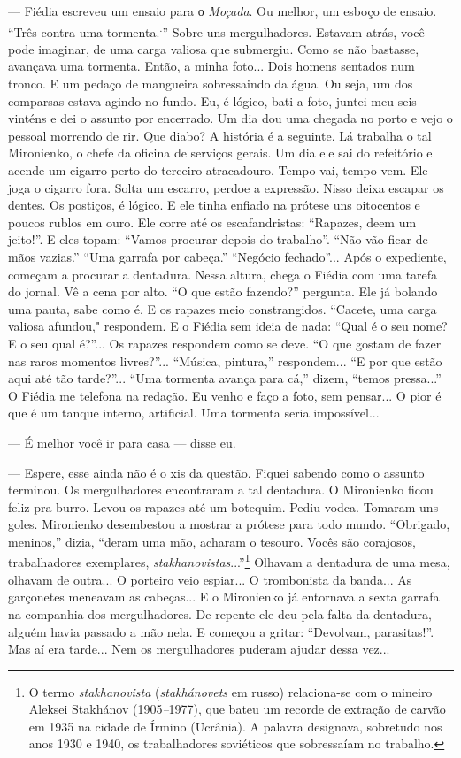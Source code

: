 --- Fiédia escreveu um ensaio para о \emph{Moçada}. Ou melhor, um esboço
de ensaio. ``Três contra uma tormenta.\textsuperscript{.}'' Sobre uns
mergulhadores. Estavam atrás, você pode imaginar, de uma carga valiosa
que submergiu. Como se não bastasse, avançava uma tormenta. Então, a
minha foto... Dois homens sentados num tronco. E um pedaço de mangueira
sobressaindo da água. Ou seja, um dos comparsas estava agindo no fundo.
Eu, é lógico, bati a foto, juntei meu seis vinténs e dei o assunto por
encerrado. Um dia dou uma chegada no porto e vejo o pessoal morrendo de
rir. Que diabo? A história é a seguinte. Lá trabalha o tal Mironienko, o
chefe da oficina de serviços gerais. Um dia ele sai do refeitório e
acende um cigarro perto do terceiro atracadouro. Tempo vai, tempo vem.
Ele joga o cigarro fora. Solta um escarro, perdoe a expressão. Nisso
deixa escapar os dentes. Os postiços, é lógico. E ele tinha enfiado na
prótese uns oitocentos e poucos rublos em ouro. Ele corre até os
escafandristas: ``Rapazes, deem um jeito!''. E eles topam: ``Vamos
procurar depois do trabalho''. ``Não vão ficar de mãos vazias.'' ``Uma
garrafa por cabeça.'' ``Negócio fechado''... Após o expediente, começam
a procurar a dentadura. Nessa altura, chega o Fiédia com uma tarefa do
jornal. Vê a cena por alto. ``O que estão fazendo?'' pergunta. Ele já
bolando uma pauta, sabe como é. E os rapazes meio constrangidos.
``Cacete, uma carga valiosa afundou," respondem. E o Fiédia sem ideia de
nada: ``Qual é o seu nome? E o seu qual é?''... Os rapazes respondem
como se deve. ``O que gostam de fazer nas raros momentos livres?''...
``Música, pintura,'' respondem... ``E por que estão aqui até tão
tarde?''... ``Uma tormenta avança para cá,'' dizem, ``temos pressa...''
O Fiédia me telefona na redação. Eu venho e faço a foto, sem pensar... O
pior é que é um tanque interno, artificial. Uma tormenta seria
impossível...

--- É melhor você ir para casa --- disse eu.

--- Espere, esse ainda não é o xis da questão. Fiquei sabendo como o
assunto terminou. Os mergulhadores encontraram a tal dentadura. O
Mironienko ficou feliz pra burro. Levou os rapazes até um botequim.
Pediu vodca. Tomaram uns goles. Mironienko desembestou a mostrar a
prótese para todo mundo. ``Obrigado, meninos,'' dizia, ``deram uma mão,
acharam o tesouro. Vocês são corajosos, trabalhadores exemplares,
\emph{stakhanovistas}...''\footnote{O termo \emph{stakhanovista}
  (\emph{stakhánovets} em russo) relaciona-se com o mineiro Aleksei
  Stakhánov (1905\emph{--}1977), que bateu um recorde de extração de
  carvão em 1935 na cidade de Írmino (Ucrânia). A palavra designava,
  sobretudo nos anos 1930 e 1940, os trabalhadores soviéticos que
  sobressaíam no trabalho.} Olhavam a dentadura de uma mesa, olhavam de
outra... O porteiro veio espiar... O trombonista da banda... As
garçonetes meneavam as cabeças... E o Mironienko já entornava a sexta
garrafa na companhia dos mergulhadores. De repente ele deu pela falta da
dentadura, alguém havia passado a mão nela. E começou a gritar:
``Devolvam, parasitas!''. Mas aí era tarde... Nem os mergulhadores
puderam ajudar dessa vez...

